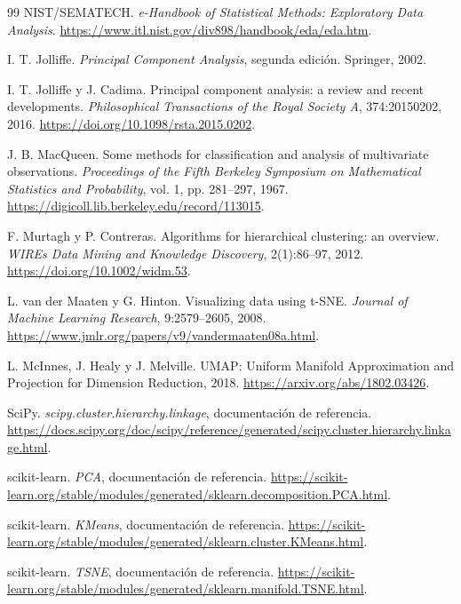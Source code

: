 \documentclass[11pt]{article}
\begin{document}
\begin{thebibliography}{99}
NIST/SEMATECH. \emph{e-Handbook of Statistical Methods:
Exploratory Data Analysis}. \url{https://www.itl.nist.gov/div898/handbook/eda/eda.htm}.

I. T. Jolliffe. \emph{Principal Component Analysis}, segunda edición.
Springer, 2002.

I. T. Jolliffe y J. Cadima. Principal component analysis: a review and
recent developments. \emph{Philosophical Transactions of the Royal Society A},
374:20150202, 2016. \url{https://doi.org/10.1098/rsta.2015.0202}.

J. B. MacQueen. Some methods for classification and analysis of multivariate
observations. \emph{Proceedings of the Fifth Berkeley Symposium on
Mathematical Statistics and Probability}, vol. 1, pp. 281--297, 1967.
\url{https://digicoll.lib.berkeley.edu/record/113015}.

F. Murtagh y P. Contreras. Algorithms for hierarchical clustering: an
overview. \emph{WIREs Data Mining and Knowledge Discovery}, 2(1):86--97,
2012. \url{https://doi.org/10.1002/widm.53}.

L. van der Maaten y G. Hinton. Visualizing data using t-SNE.
\emph{Journal of Machine Learning Research}, 9:2579--2605, 2008.
\url{https://www.jmlr.org/papers/v9/vandermaaten08a.html}.

L. McInnes, J. Healy y J. Melville. UMAP: Uniform Manifold Approximation
and Projection for Dimension Reduction, 2018.
\url{https://arxiv.org/abs/1802.03426}.

SciPy. \emph{scipy.cluster.hierarchy.linkage}, documentación de referencia.
\url{https://docs.scipy.org/doc/scipy/reference/generated/scipy.cluster.hierarchy.linkage.html}.

scikit-learn. \emph{PCA}, documentación de referencia.
\url{https://scikit-learn.org/stable/modules/generated/sklearn.decomposition.PCA.html}.

scikit-learn. \emph{KMeans}, documentación de referencia.
\url{https://scikit-learn.org/stable/modules/generated/sklearn.cluster.KMeans.html}.

scikit-learn. \emph{TSNE}, documentación de referencia.
\url{https://scikit-learn.org/stable/modules/generated/sklearn.manifold.TSNE.html}.


\end{thebibliography}
\end{document}
